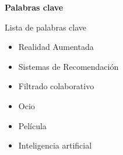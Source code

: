 \begin{center}

{\bf \Large Palabras clave}

   \end{center}

   \vspace{0.5cm}
   
   Lista de palabras clave
   \begin{itemize}  
    \item Realidad Aumentada
    \item Sistemas de Recomendación
    \item Filtrado colaborativo
    \item Ocio
    \item Película
    \item Inteligencia artificial
  \end{itemize}
   



